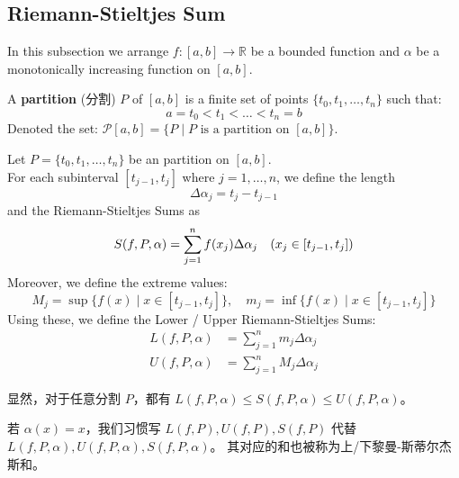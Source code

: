 \documentclass[
	UTF-8,
	11pt, %
	a4paper, %
]{LegrandOrangeBook}
\begin{document}
    \subsection{Riemann-Stieltjes Sum}

    In this subsection we arrange $f: [a, b] \to \mathbb{R} $ be a bounded function and 
        $\alpha$ be a monotonically increasing function on $[a, b]$.

    \begin{definition}[Partition]
    A \textbf{partition} (分割) $P$ of $[a, b]$ is a finite set 
    of points $\{t_0, t_1, \dots, t_n\}$ such that:
    \[ a = t_0 < t_1 < \dots < t_n = b \]
    Denoted the set: $\mathcal{P}[a,b] = \{ P \mid \text{$P$ is a partition on $[a,b]$} \}$.
    \end{definition}

    \begin{definition}
        Let $P = \{t_0, t_1, \dots, t_n\}$ be an partition on $[a,b]$. \\

        For each subinterval $[t_{j-1}, t_j]$ where $j = 1, \dots, n$, 
        we define the length $$\Delta \alpha_j = t_j - t_{j-1}$$ 
        and the Riemann-Stieltjes Sums as
        \[ S(f,P,\alpha) = \sum_{j=1}^{n} f(x_j)\Delta\alpha_j \quad (x_j \in [t_{j-1}, t_j] ) \\ \]
        Moreover, we define the extreme values:
        \[ M_j = \sup \{ f(x) \mid x \in [t_{j-1}, t_j] \}, \quad m_j = \inf \{ f(x) \mid x \in [t_{j-1}, t_j] \} \]
        Using these, we define the Lower / Upper Riemann-Stieltjes Sums:
        \begin{align*}
            L(f, P,\alpha) &= \sum_{j=1}^n m_j \Delta \alpha_j \\
            U(f, P,\alpha) &= \sum_{j=1}^n M_j \Delta \alpha_j
        \end{align*}
    \end{definition}

    \begin{remark}
        显然，对于任意分割 $P$，都有 $L(f, P,\alpha) \le S(f, P,\alpha) \le U(f, P,\alpha)$。
    \end{remark}

    \begin{remark}
        若 $\alpha(x) = x$，我们习惯写 $L(f, P) , U(f, P), S(f, P)$ 代替 $L(f, P,\alpha) , U(f, P,\alpha), S(f, P,\alpha)$。
        其对应的和也被称为上/下黎曼-斯蒂尔杰斯和。
    \end{remark}
\end{document}
